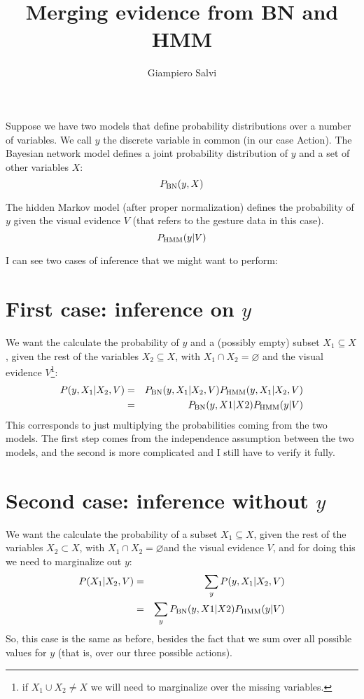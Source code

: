 \documentclass{article}
\title{Merging evidence from BN and HMM}
\author{Giampiero Salvi}
\begin{document}
\maketitle

\newcommand{\pbn}{\ensuremath P_{\mbox{\scriptsize BN}}}
\newcommand{\phmm}{\ensuremath P_{\mbox{\scriptsize HMM}}}

Suppose we have two models that define probability distributions over a number of variables.
We call $y$ the discrete variable in common (in our case Action).
The Bayesian network model defines a joint probability distribution of $y$ and a set of other variables $X$:
\begin{equation}
\pbn(y,X)
\end{equation}

The hidden Markov model (after proper normalization) defines the probability of $y$ given the visual evidence $V$ (that refers to the gesture data in this case).
\begin{equation}
\phmm(y|V)
\end{equation}

I can see two cases of inference that we might want to perform:
\section{First case: inference on $y$}
We want the calculate the probability of $y$ and a (possibly empty) subset $X_1 \subseteq X$, given the rest of the variables $X_2\subseteq X$, with $X_1 \cap X_2 = \varnothing$ and the visual evidence $V$\footnote{if $X_1 \cup X_2 \neq X$ we will need to marginalize over the missing variables.}:
\begin{eqnarray}
P(y, X_1|X_2, V) &=& \pbn(y, X_1|X_2,V)\phmm(y,X_1|X_2,V) \\
&=& \pbn(y,X1|X2)\phmm(y|V) \label{bn-hmm1}
\end{eqnarray}
This corresponds to just multiplying the probabilities coming from the two models.
The first step comes from the independence assumption between the two models, and the second is more complicated and I still have to verify it fully.

\section{Second case: inference without $y$}
We want the calculate the probability of a subset $X_1 \subseteq X$, given the rest of the variables $X_2\subset X$, with $X_1 \cap X_2 = \varnothing$\footnotemark[\value{footnote}] and the visual evidence $V$, and for doing this we need to marginalize out $y$:
\begin{eqnarray}
P(X_1|X_2, V) &=& \sum_y P(y, X_1|X_2, V) \\
&=& \sum_y \pbn(y,X1|X2)\phmm(y|V) \label{bn-hmm2}
\end{eqnarray}
So, this case is the same as before, besides the fact that we sum over all possible values for $y$ (that is, over our three possible actions).
\end{document}
